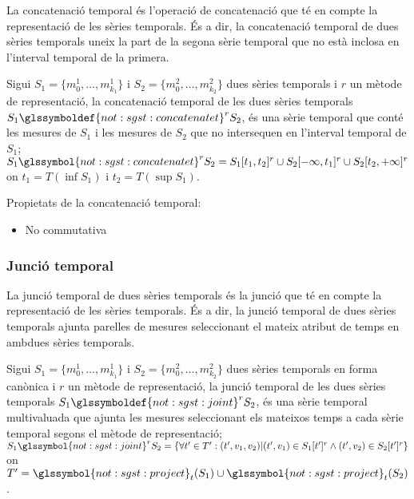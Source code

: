 La concatenació temporal és l'operació de concatenació que té en
compte la representació de les sèries temporals.  És a dir, la
concatenació temporal de dues sèries temporals uneix la part de la
segona sèrie temporal que no està inclosa en l'interval temporal de la
primera.


\begin{definition}
  Sigui $S_1=\{m_0^1, \dotsc, m_{k_1}^1\}$ i $S_2=\{m_0^2, \dotsc,
  m_{k_2}^2\}$ dues sèries temporals i $r$ un mètode de representació,
  la concatenació temporal de les dues sèries temporals $S_1
  \glssymboldef{not:sgst:concatenatet}^r S_2$, és una sèrie temporal
  que conté les mesures de $S_1$ i les mesures de $S_2$ que no
  intersequen en l'interval temporal de $S_1$; $S_1
  \glssymbol{not:sgst:concatenatet}^r S_2 = S_1[t_1,t_2]^r \cup
  S_2[-\infty,t_1]^r \cup S_2[t_2,+\infty]^r$ on $t_1=T(\inf S_1)$ i
  $t_2=T(\sup S_1)$.
\end{definition}

Propietats de la concatenació temporal:
\begin{itemize}
\item No commutativa
\end{itemize}




\subsubsection{Junció temporal}

La junció temporal de dues sèries temporals és la junció que té en
compte la representació de les sèries temporals. És a dir, la junció
temporal de dues sèries temporals ajunta parelles de mesures
seleccionant el mateix atribut de temps en ambdues sèries temporals.


\begin{definition}\label{def:sgst:joint}
  Sigui $S_1=\{m_0^1, \dotsc, m_{k_1}^1\}$ i $S_2=\{m_0^2, \dotsc,
  m_{k_2}^2\}$ dues sèries temporals en forma canònica i $r$ un mètode
  de representació, la junció temporal de les dues sèries temporals
  $S_1 \glssymboldef{not:sgst:joint}^r S_2$, és una sèrie temporal
  multivaluada que ajunta les mesures seleccionant els mateixos temps
  a cada sèrie temporal segons el mètode de representació; $S_1
  \glssymbol{not:sgst:joint}^r S_2 = \{\forall t' \in T': (t',v_1,v_2)
  | (t',v_1) \in S_1[t']^r \wedge (t',v_2) \in S_2[t']^r \}$ on $T' =
  \glssymbol{not:sgst:project}_{t}(S_1) \cup
  \glssymbol{not:sgst:project}_{t}(S_2)$.
\end{definition}


